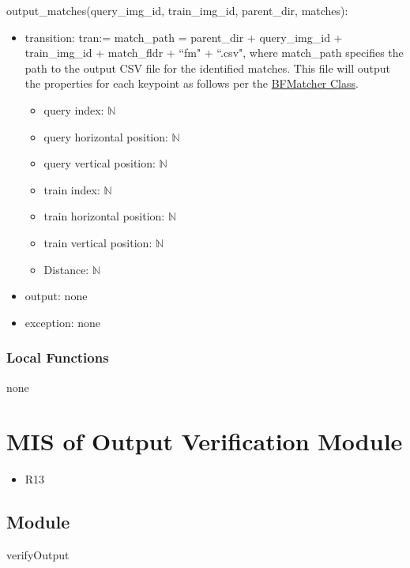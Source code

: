\documentclass[12pt, titlepage]{article}
\begin{document}
  
  \noindent output\_matches(query\_img\_id, train\_img\_id, parent\_dir, matches):
  \begin{itemize}
    \item transition: tran:= match\_path = parent\_dir + query\_img\_id + train\_img\_id + match\_fldr + ``fm" + ``.csv", 
    where match\_path specifies the path to the output CSV file for the identified matches. 
    This file will output the properties for each keypoint as 
    follows per the \href{https://docs.opencv.org/3.4/d3/da1/classcv_1_1BFMatcher.html}{BFMatcher Class}.
    \begin{itemize}
      \item query index: $\mathbb{N}$
      \item query horizontal position: $\mathbb{N}$
      \item query vertical position: $\mathbb{N}$
      \item train index: $\mathbb{N}$
      \item train horizontal position: $\mathbb{N}$
      \item train vertical position: $\mathbb{N}$
      \item Distance: $\mathbb{N}$
    \end{itemize}
    \item output: none
    \item exception: none
  \end{itemize}


\subsubsection{Local Functions}
none

\newpage
\section{MIS of Output Verification Module} \label{mOV}
\begin{itemize}
  \item R13
\end{itemize}
\subsection{Module}

verifyOutput
\end{document}
